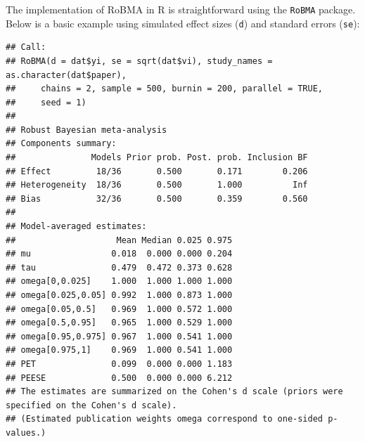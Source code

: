 \documentclass[
]{book}
\newenvironment{Shaded}{\begin{snugshade}}{\end{snugshade}}
\newcommand{\AttributeTok}[1]{\textcolor[rgb]{0.13,0.29,0.53}{#1}}
\newcommand{\CommentTok}[1]{\textcolor[rgb]{0.56,0.35,0.01}{\textit{#1}}}
\newcommand{\ConstantTok}[1]{\textcolor[rgb]{0.56,0.35,0.01}{#1}}
\newcommand{\DecValTok}[1]{\textcolor[rgb]{0.00,0.00,0.81}{#1}}
\newcommand{\FunctionTok}[1]{\textcolor[rgb]{0.13,0.29,0.53}{\textbf{#1}}}
\newcommand{\NormalTok}[1]{#1}
\newcommand{\OtherTok}[1]{\textcolor[rgb]{0.56,0.35,0.01}{#1}}
\newcommand{\SpecialCharTok}[1]{\textcolor[rgb]{0.81,0.36,0.00}{\textbf{#1}}}
\begin{document}
The implementation of RoBMA in R is straightforward using the \texttt{RoBMA} package. Below is a basic example using simulated effect sizes (\texttt{d}) and standard errors (\texttt{se}):

\begin{Shaded}
\end{Shaded}

\begin{verbatim}
## Call:
## RoBMA(d = dat$yi, se = sqrt(dat$vi), study_names = as.character(dat$paper), 
##     chains = 2, sample = 500, burnin = 200, parallel = TRUE, 
##     seed = 1)
## 
## Robust Bayesian meta-analysis
## Components summary:
##               Models Prior prob. Post. prob. Inclusion BF
## Effect         18/36       0.500       0.171        0.206
## Heterogeneity  18/36       0.500       1.000          Inf
## Bias           32/36       0.500       0.359        0.560
## 
## Model-averaged estimates:
##                    Mean Median 0.025 0.975
## mu                0.018  0.000 0.000 0.204
## tau               0.479  0.472 0.373 0.628
## omega[0,0.025]    1.000  1.000 1.000 1.000
## omega[0.025,0.05] 0.992  1.000 0.873 1.000
## omega[0.05,0.5]   0.969  1.000 0.572 1.000
## omega[0.5,0.95]   0.965  1.000 0.529 1.000
## omega[0.95,0.975] 0.967  1.000 0.541 1.000
## omega[0.975,1]    0.969  1.000 0.541 1.000
## PET               0.099  0.000 0.000 1.183
## PEESE             0.500  0.000 0.000 6.212
## The estimates are summarized on the Cohen's d scale (priors were specified on the Cohen's d scale).
## (Estimated publication weights omega correspond to one-sided p-values.)
\end{verbatim}
\end{document}
